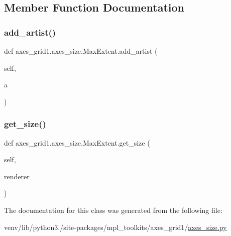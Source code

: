 \subsection{Member Function Documentation}
\mbox{\label{classaxes__grid1_1_1axes__size_1_1MaxExtent_ad5f271005ee4f0de5ed14724ac020ae0}} 
\subsubsection{\texorpdfstring{add\+\_\+artist()}{add\_artist()}}
{\footnotesize\ttfamily def axes\+\_\+grid1.\+axes\+\_\+size.\+Max\+Extent.\+add\+\_\+artist (\begin{DoxyParamCaption}\item[{}]{self,  }\item[{}]{a }\end{DoxyParamCaption})}

\mbox{\label{classaxes__grid1_1_1axes__size_1_1MaxExtent_a1e9833f2eeede046fb6e25e2bf29c0e0}} 
\subsubsection{\texorpdfstring{get\+\_\+size()}{get\_size()}}
{\footnotesize\ttfamily def axes\+\_\+grid1.\+axes\+\_\+size.\+Max\+Extent.\+get\+\_\+size (\begin{DoxyParamCaption}\item[{}]{self,  }\item[{}]{renderer }\end{DoxyParamCaption})}



The documentation for this class was generated from the following file\+:\begin{DoxyCompactItemize}
\item 
venv/lib/python3./site-\/packages/mpl\+\_\+toolkits/axes\+\_\+grid1/\hyperlink{_2axes__size_8py}{axes\+\_\+size.\+py}\end{DoxyCompactItemize}
